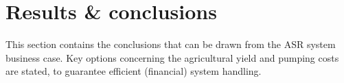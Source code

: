 %
%
% 
%

\section{Results \& conclusions}
\label{section:Yields_conclusions}
This section contains the conclusions that can be drawn from the ASR system business case. Key options concerning the agricultural yield and pumping costs are stated, to guarantee efficient (financial) system handling. \\


